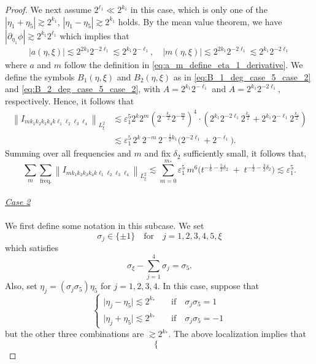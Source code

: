 \documentclass[reqno,english,11pt]{amsart}
\newcommand{\eps}{\varepsilon}
\newcommand{\snorm}[1]{\left\|#1\right\|}
\theoremstyle{definition}
\numberwithin{equation}{section}
\begin{document}
\begin{proof}
We next assume $2^{\ell_1}\ll 2^{k_1}$ in this case,  which is only one of the $|\eta_1+\eta_5|\gtrsim 2^{k_1}$, $|\eta_1-\eta_5|\gtrsim 2^{k_1}$ holds. By the mean value theorem, we have $\left|\partial_{\eta_1}\phi\right|\gtrsim 2^{k_1}2^{\ell_1}$ which implies that
    \begin{align*}
         \left|a(\eta,\xi)\right| \lesssim 2^{2k_1}2^{-2\ell_1} \lesssim 2^{k_1}2^{-\ell_1}, \quad \left|m(\eta,\xi)\right| \lesssim 2^{2k_1}2^{-2\ell_1} \lesssim 2^{k_1}2^{-2\ell_1}
    \end{align*}
where $a$ and $m$ follow the definition in \eqref{eq:a_m_define_eta_1_derivative}.
We define the symbols $B_1(\eta,\xi)$ and $B_2(\eta,\xi)$ as in
\eqref{eq:B_1_deg_case_5_case_2} and \eqref{eq:B_2_deg_case_5_case_2}, with $A = 2^{k_1}2^{-\ell_1}$ and $A = 2^{k_1}2^{-2\ell_1},$ respectively. Hence, it follows that
\begin{align*}
    \snorm{I_{mk_1k_2k_3k_4k\ell_1\ell_2\ell_3\ell_4}}_{L^2_\xi}&\lesssim \eps_1^5 2^k 2^m \left(2^{-\frac{k_1}{2}}2^{-\frac{m}{2}}\right)^4\cdot \left(2^{k_1}2^{-2\ell_1}2^{\frac{k_1}{2}}+2^{k_1}2^{-\ell_1}2^{\frac{k_1}{2}}\right)\\
    &\lesssim \eps_1^5\,2^k\,2^{-m}\,2^{-\,\frac12 k_1}\Big(2^{-2\ell_1}+2^{-\ell_1}\Big).
\end{align*}
Summing over all frequencies and $m$ and fix $\delta_2$ sufficiently small, it follows that,
$$\sum_{m}\sum_{\operatorname{freq.}}\snorm{I_{mk_1k_2k_3k_4k\ell_1\ell_2\ell_3\ell_4}}_{L^2_\xi}\lesssim \sum^{m_*}_{m=0}\eps_1^5\,m^{6}\Big(t^{-\frac16-\frac{5}{2}\delta_2}\;+\;t^{-\frac12-\frac{3}{2}\delta_2}\Big)\lesssim \eps_1^5.$$
\\
\noindent
\underline{\textit{Case 2}}
\\\\
We first define some notation in this subcase. We set
$$\sigma_j\in \{\pm 1\}\quad \text{for}\quad j=1,2,3,4,5,\xi$$ 
which satisfies 
$$\sigma_\xi-\sum^4_{j=1}\sigma_j=\sigma_5.$$
Also, set  $\eta_j=(\sigma_j\sigma_5)\eta_5$ for $j=1,2,3,4$.
In this case, suppose that
$$
\begin{cases}
    \vert \eta_j-\eta_5\vert\lesssim 2^{k_*}\quad \;\;\;\text{if}\quad\sigma_j\sigma_5=1\\
    \vert \eta_j+\eta_5\vert\lesssim 2^{k_*}\quad \;\;\;\text{if}\quad\sigma_j\sigma_5=-1
\end{cases}
$$
but the other three combinations are $\gtrsim 2^{k_*}$. The above localization implies that 
$$
\begin{cases}

\end{cases}$$
\end{proof}
\end{document}
